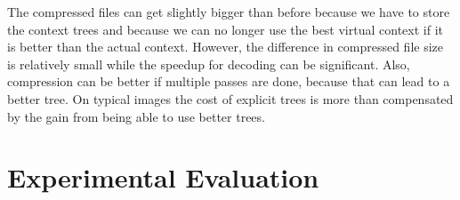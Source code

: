 \documentclass{article}
\begin{document}
{The compressed files can get slightly bigger than before
because we have to store the context trees and because we can no longer
use the best virtual context if it is better than the actual context.
However, the difference in compressed file size is relatively small while the
speedup for decoding can be significant.
Also, compression can be better if multiple passes are done, because that can lead to a better tree.
On typical images the cost of explicit trees is more than compensated by the gain from being able to use better trees.
}



\section{Experimental Evaluation}
\label{sec:benchmarks}
\end{document}
